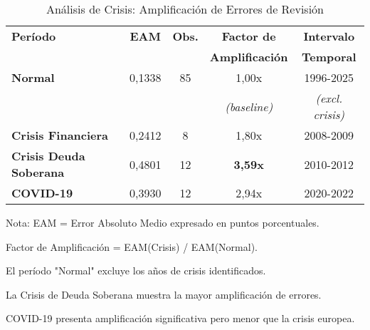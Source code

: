 \begin{table}[h]
\centering
\caption{Análisis de Crisis: Amplificación de Errores de Revisión}
\label{tab:analisis_crisis}
\begin{tabular}{lcccc}
\toprule
\textbf{Período} & \textbf{EAM} & \textbf{Obs.} & \textbf{Factor de} & \textbf{Intervalo} \\
 & & & \textbf{Amplificación} & \textbf{Temporal} \\
\midrule
\textbf{Normal} & 0,1338 & 85 & 1,00x & 1996-2025 \\
& & & \textit{(baseline)} & \textit{(excl. crisis)} \\
\midrule
\textbf{Crisis Financiera} & 0,2412 & 8 & 1,80x & 2008-2009 \\
\textbf{Crisis Deuda Soberana} & 0,4801 & 12 & \textbf{3,59x} & 2010-2012 \\
\textbf{COVID-19} & 0,3930 & 12 & 2,94x & 2020-2022 \\
\bottomrule
\end{tabular}
\begin{tablenotes}
\footnotesize
\item Nota: EAM = Error Absoluto Medio expresado en puntos porcentuales.
\item Factor de Amplificación = EAM(Crisis) / EAM(Normal).
\item El período "Normal" excluye los años de crisis identificados.
\item La Crisis de Deuda Soberana muestra la mayor amplificación de errores.
\item COVID-19 presenta amplificación significativa pero menor que la crisis europea.
\end{tablenotes}
\end{table}